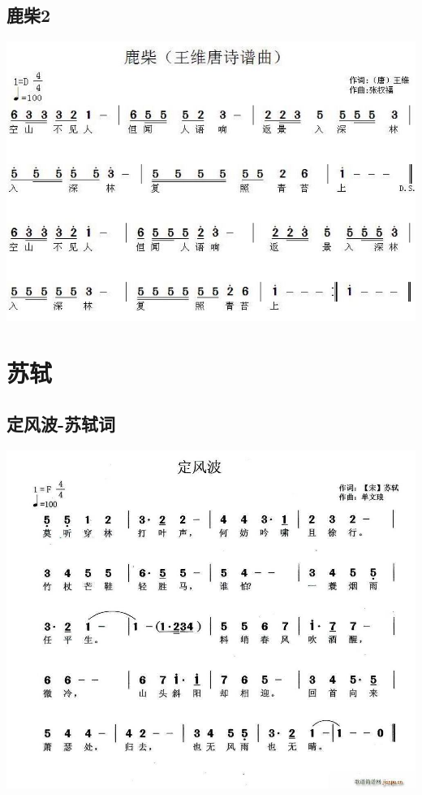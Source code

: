 \documentclass[cn,pad,chinesefont=nofont]{elegantbook}
\begin{document}
\section{鹿柴2}
    \includegraphics[width=\textwidth]{dongxiao/20200627-王维-鹿柴2.jpg} 


\chapter{苏轼}
\section{定风波-苏轼词}
    \includegraphics[width=\textwidth]{dongxiao/20200411-定风波.jpg}
\end{document}
